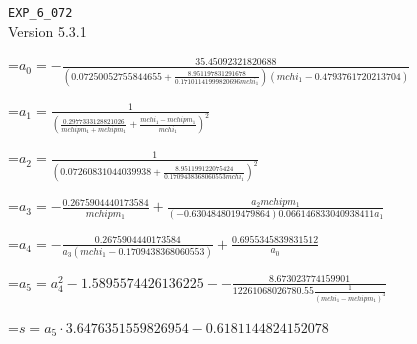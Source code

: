 \documentclass{article}
\newcommand{\exprline}[1]{\par\noindent\begingroup\setbox0=\hbox{$\displaystyle #1$}\ifdim\wd0>\linewidth\resizebox{\linewidth}{!}{\box0}\else\box0\fi\endgroup\par\medskip}
\begin{document}
\noindent\texttt{EXP\_6\_072}\\
Version 5.3.1\\
\exprline{a_{0} = - \frac{35.45092321820688}{\left(0.07250052755844655 + \frac{8.951197831291678}{0.17101141999820696 mchi_{1}}\right) \left(mchi_{1} - 0.4793761720213704\right)}}
\exprline{a_{1} = \frac{1}{\left(\frac{0.2977333128821026}{mchipm_{1} + mchipm_{1}} + \frac{mchi_{1} - mchipm_{1}}{mchi_{1}}\right)^{2}}}
\exprline{a_{2} = \frac{1}{\left(0.07260831044039938 + \frac{8.951199122075424}{0.1709438368060553 mchi_{1}}\right)^{2}}}
\exprline{a_{3} = - \frac{0.2675904440173584}{mchipm_{1}} + \frac{a_{2} mchipm_{1}}{\left(-0.6304848019479864\right) 0.066146833040938411 a_{1}}}
\exprline{a_{4} = - \frac{0.2675904440173584}{a_{3} \left(mchi_{1} - 0.1709438368060553\right)} + \frac{0.6955345839831512}{a_{0}}}
\exprline{a_{5} = a_{4}^{2} - 1.5895574426136225 - - \frac{8.673023774159901}{12261068026780.55 \frac{1}{\left(mchi_{1} - mchipm_{1}\right)^{4}}}}
\exprline{s = a_{5} \cdot 3.6476351559826954 - 0.6181144824152078}
\end{document}
